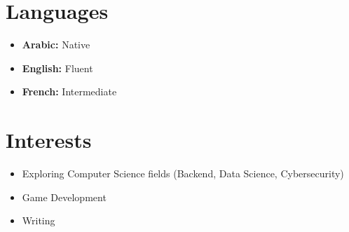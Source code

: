 \documentclass[a4paper,10pt]{article}
\begin{document}
\begin{minipage}[t]{0.48\textwidth}
\section*{Languages}
\begin{itemize}
    \item \textbf{Arabic:} Native
    \item \textbf{English:} Fluent
    \item \textbf{French:} Intermediate
\end{itemize}
\end{minipage}
\hfill
\begin{minipage}[t]{0.49\textwidth}
\section*{Interests}
\begin{itemize}
    \item Exploring Computer Science fields (Backend, Data Science, Cybersecurity)
    \item Game Development
    \item Writing
\end{itemize}
\end{minipage}
\end{document}
